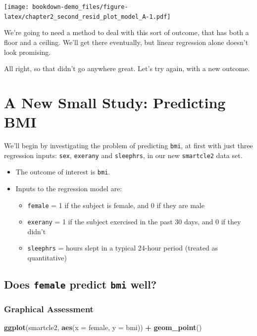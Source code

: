 \documentclass[]{book}
\newenvironment{Shaded}{\begin{snugshade}}{\end{snugshade}}
\newcommand{\KeywordTok}[1]{\textcolor[rgb]{0.13,0.29,0.53}{\textbf{#1}}}
\newcommand{\DataTypeTok}[1]{\textcolor[rgb]{0.13,0.29,0.53}{#1}}
\newcommand{\StringTok}[1]{\textcolor[rgb]{0.31,0.60,0.02}{#1}}
\newcommand{\OperatorTok}[1]{\textcolor[rgb]{0.81,0.36,0.00}{\textbf{#1}}}
\newcommand{\NormalTok}[1]{#1}
\providecommand{\tightlist}{%
  \setlength{\itemsep}{0pt}\setlength{\parskip}{0pt}}
\theoremstyle{definition}
\theoremstyle{definition}
\theoremstyle{definition}
\theoremstyle{remark}
\begin{document}
\texttt{[image: bookdown-demo\_files/figure-latex/chapter2\_second\_resid\_plot\_model\_A-1.pdf]}

We're going to need a method to deal with this sort of outcome, that has
both a floor and a ceiling. We'll get there eventually, but linear
regression alone doesn't look promising.

All right, so that didn't go anywhere great. Let's try again, with a new
outcome.

\section{A New Small Study: Predicting
BMI}\label{a-new-small-study-predicting-bmi}

We'll begin by investigating the problem of predicting \texttt{bmi}, at
first with just three regression inputs: \texttt{sex}, \texttt{exerany}
and \texttt{sleephrs}, in our new \texttt{smartcle2} data set.

\begin{itemize}
\tightlist
\item
  The outcome of interest is \texttt{bmi}.
\item
  Inputs to the regression model are:

  \begin{itemize}
  \tightlist
  \item
    \texttt{female} = 1 if the subject is female, and 0 if they are male
  \item
    \texttt{exerany} = 1 if the subject exercised in the past 30 days,
    and 0 if they didn't
  \item
    \texttt{sleephrs} = hours slept in a typical 24-hour period (treated
    as quantitative)
  \end{itemize}
\end{itemize}

\subsection{\texorpdfstring{Does \texttt{female} predict \texttt{bmi}
well?}{Does female predict bmi well?}}\label{does-female-predict-bmi-well}

\subsubsection{Graphical Assessment}\label{graphical-assessment}

\begin{Shaded}
\begin{Highlighting}[]
\KeywordTok{ggplot}\NormalTok{(smartcle2, }\KeywordTok{aes}\NormalTok{(}\DataTypeTok{x =}\NormalTok{ female, }\DataTypeTok{y =}\NormalTok{ bmi)) }\OperatorTok{+}
\StringTok{    }\KeywordTok{geom_point}\NormalTok{()}
\end{Highlighting}
\end{Shaded}
\end{document}
